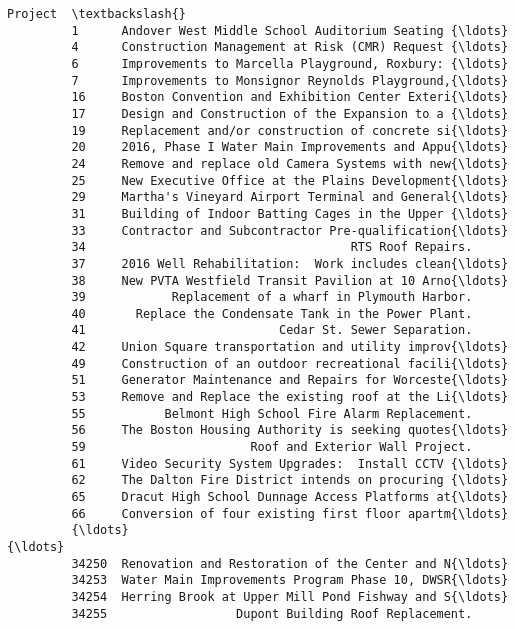 \documentclass[11pt]{article}
\begin{document}
\begin{Verbatim}[commandchars=\\\{\}]
                                                          Project  \textbackslash{}
         1      Andover West Middle School Auditorium Seating {\ldots}   
         4      Construction Management at Risk (CMR) Request {\ldots}   
         6      Improvements to Marcella Playground, Roxbury: {\ldots}   
         7      Improvements to Monsignor Reynolds Playground,{\ldots}   
         16     Boston Convention and Exhibition Center Exteri{\ldots}   
         17     Design and Construction of the Expansion to a {\ldots}   
         19     Replacement and/or construction of concrete si{\ldots}   
         20     2016, Phase I Water Main Improvements and Appu{\ldots}   
         24     Remove and replace old Camera Systems with new{\ldots}   
         25     New Executive Office at the Plains Development{\ldots}   
         29     Martha's Vineyard Airport Terminal and General{\ldots}   
         31     Building of Indoor Batting Cages in the Upper {\ldots}   
         33     Contractor and Subcontractor Pre-qualification{\ldots}   
         34                                     RTS Roof Repairs.   
         37     2016 Well Rehabilitation:  Work includes clean{\ldots}   
         38     New PVTA Westfield Transit Pavilion at 10 Arno{\ldots}   
         39            Replacement of a wharf in Plymouth Harbor.   
         40       Replace the Condensate Tank in the Power Plant.   
         41                           Cedar St. Sewer Separation.   
         42     Union Square transportation and utility improv{\ldots}   
         49     Construction of an outdoor recreational facili{\ldots}   
         51     Generator Maintenance and Repairs for Worceste{\ldots}   
         53     Remove and Replace the existing roof at the Li{\ldots}   
         55           Belmont High School Fire Alarm Replacement.   
         56     The Boston Housing Authority is seeking quotes{\ldots}   
         59                       Roof and Exterior Wall Project.   
         61     Video Security System Upgrades:  Install CCTV {\ldots}   
         62     The Dalton Fire District intends on procuring {\ldots}   
         65     Dracut High School Dunnage Access Platforms at{\ldots}   
         66     Conversion of four existing first floor apartm{\ldots}   
         {\ldots}                                                  {\ldots}   
         34250  Renovation and Restoration of the Center and N{\ldots}   
         34253  Water Main Improvements Program Phase 10, DWSR{\ldots}   
         34254  Herring Brook at Upper Mill Pond Fishway and S{\ldots}   
         34255                  Dupont Building Roof Replacement.   

\end{Verbatim}
\end{document}
